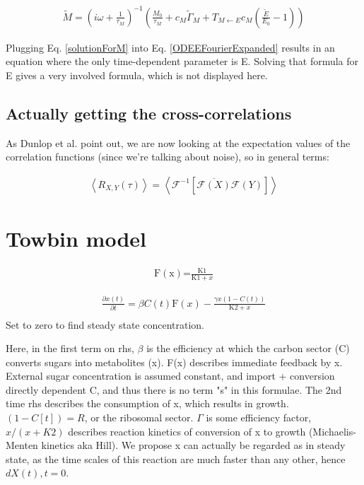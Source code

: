\documentclass[a4paper,twoside,10pt]{report}
\begin{document}
\begin{align}
\label{solutionForM}
\tilde{M} = \left( i \omega + \frac{1}{\tau_M} \right)^{-1} \left( \frac{M_0}{\tau_M} + c_M \tilde{\Gamma}_M + T_{M \leftarrow E} c_M (\frac{\tilde{E}}{E_0} - 1) \right)
\end{align}

Plugging Eq. \ref{solutionForM} into Eq. \ref{ODEEFourierExpanded} results in an equation where the only time-dependent parameter is E.
Solving that formula for E gives a very involved formula, which is not displayed here.

\subsection{Actually getting the cross-correlations}

As Dunlop et al. point out, we are now looking at the expectation values of the correlation functions (since we're talking about noise), so in general terms:

\begin{align}
\left< R_{X,Y}(\tau)\right > = 
\left< \mathcal{F}^{-1} \left[ \overline{\mathcal{F} (X)} \mathcal{F}(Y) \right] \right>
\end{align}

\section{Towbin model}

\begin{align}
\text{F}(\text{x})\text{=}\frac{\text{K1}}{\text{K1}+x}
\end{align}

\begin{align}
\frac{\partial x(t)}{\partial t}=\beta  C(t) \text{F}(x)-\frac{\gamma  x \left(1-C(t)\right)}{\text{K2}+x} \\
\end{align}
Set to zero to find steady state concentration.

Here, in the first term on rhs, $\beta$ is the efficiency at which the carbon sector (C) converts sugars into metabolites (x). F(x) describes immediate feedback by x. External sugar concentration is assumed constant, and import + conversion directly dependent C, and thus there is no term "s" in this formulae.
The 2nd time rhs describes the consumption of x, which results in growth. $(1-C[t]) = R$, or the ribosomal sector. $\Gamma$ is some efficiency factor, $x/(x+K2)$ describes reaction kinetics of conversion of x to growth (Michaelis-Menten kinetics aka Hill). 
We propose x can actually be regarded as in steady state, as the time scales of this reaction are much faster than any other, hence $dX(t),t = 0$. 
\end{document}
